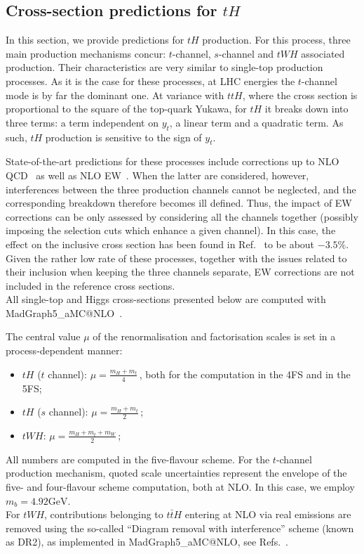 
\subsection{Cross-section predictions for $t H$}
\label{sec:results-xsects-singleth}
In this section, we provide predictions for $tH$ production. 
For this process, three main production mechanisms concur: 
$t$-channel, $s$-channel and $tWH$ associated production. Their characteristics are very similar to single-top production processes. As it is the case
for these processes, at LHC energies the $t$-channel mode is by far the dominant one. At variance with $ttH$, where the cross section
is proportional to the square of the top-quark Yukawa, for $tH$ it breaks down into three terms: a term independent on $y_t$, a linear term and a quadratic
term. As such, $tH$ production is sensitive to the sign of $y_t$. 

State-of-the-art predictions
for these processes include corrections up to NLO QCD~\cite{Demartin:2015uha,Demartin:2016axk} as well as NLO EW~\cite{Pagani:2020mov}. When
the latter are considered, however, interferences between the three production channels cannot be neglected, and the corresponding breakdown 
therefore becomes ill defined. Thus, the impact of EW corrections can be only assessed
by considering all the channels together (possibly imposing the selection cuts which enhance a given channel). In this case, the effect on the inclusive
cross section has been found in Ref.~\cite{Pagani:2020mov} to be about $-3.5\%$. Given the rather low rate of these processes, together with
the issues related to their inclusion when keeping the three channels separate, EW
corrections are not included in the reference cross sections.\\

All single-top and Higgs cross-sections presented below are computed with {\sc MadGraph5\_aMC@NLO}~\cite{Alwall:2014hca,Frederix:2018nkq}. 

The central value $\mu$ of the renormalisation and factorisation scales is set in a process-dependent manner:
\begin{itemize}
    \item $tH$ ($t$ channel): $\mu= \frac{m_H+m_t}{4}\,$, both for the computation in the 4FS and in the 5FS;
    \item $tH$ ($s$ channel): $\mu= \frac{m_H+m_t}{2}\,$;
    \item $tWH$: $\mu= \frac{m_H+m_t+m_W}{2}\,$;
\end{itemize}
All numbers are computed in the five-flavour scheme. For the $t$-channel production mechanism, quoted scale uncertainties represent the envelope of the
five- and four-flavour scheme computation, both at NLO. In this case, we employ $m_b=4.92 \textrm{GeV}$.\\
For $tWH$, contributions belonging to $t\bar t H$ entering at NLO via real emissions are removed using the so-called ``Diagram removal with interference'' 
scheme (known as DR2), as implemented in {\sc MadGraph5\_aMC@NLO}, see Refs.~\cite{Demartin:2016axk,Frixione:2019fxg}.

